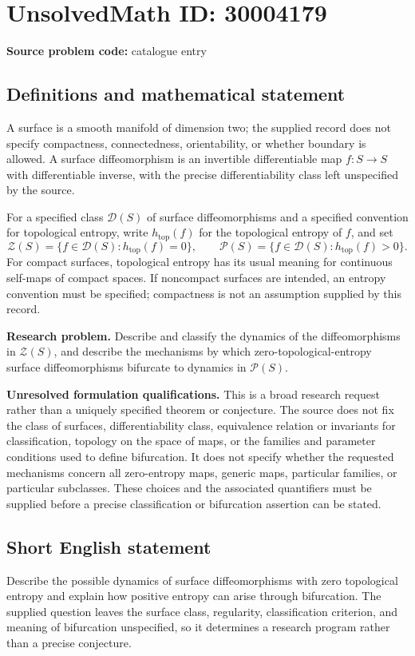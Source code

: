 \documentclass[11pt]{article}
\begin{document}
\section*{UnsolvedMath ID: 30004179}
\textbf{Source problem code:} catalogue entry
\subsection{Definitions and mathematical statement}
A surface is a smooth manifold of dimension two; the supplied record does not specify compactness, connectedness, orientability, or whether boundary is allowed. A surface diffeomorphism is an invertible differentiable map \(f\colon S\to S\) with differentiable inverse, with the precise differentiability class left unspecified by the source.

For a specified class \(\mathcal D(S)\) of surface diffeomorphisms and a specified convention for topological entropy, write \(h_{\mathrm{top}}(f)\) for the topological entropy of \(f\), and set
\[
\mathcal Z(S)=\{f\in\mathcal D(S):h_{\mathrm{top}}(f)=0\},
\qquad
\mathcal P(S)=\{f\in\mathcal D(S):h_{\mathrm{top}}(f)>0\}.
\]
For compact surfaces, topological entropy has its usual meaning for continuous self-maps of compact spaces. If noncompact surfaces are intended, an entropy convention must be specified; compactness is not an assumption supplied by this record.

\textbf{Research problem.} Describe and classify the dynamics of the diffeomorphisms in \(\mathcal Z(S)\), and describe the mechanisms by which zero-topological-entropy surface diffeomorphisms bifurcate to dynamics in \(\mathcal P(S)\).

\textbf{Unresolved formulation qualifications.} This is a broad research request rather than a uniquely specified theorem or conjecture. The source does not fix the class of surfaces, differentiability class, equivalence relation or invariants for classification, topology on the space of maps, or the families and parameter conditions used to define bifurcation. It does not specify whether the requested mechanisms concern all zero-entropy maps, generic maps, particular families, or particular subclasses. These choices and the associated quantifiers must be supplied before a precise classification or bifurcation assertion can be stated.
\subsection{Short English statement}
Describe the possible dynamics of surface diffeomorphisms with zero topological entropy and explain how positive entropy can arise through bifurcation. The supplied question leaves the surface class, regularity, classification criterion, and meaning of bifurcation unspecified, so it determines a research program rather than a precise conjecture.
\end{document}
